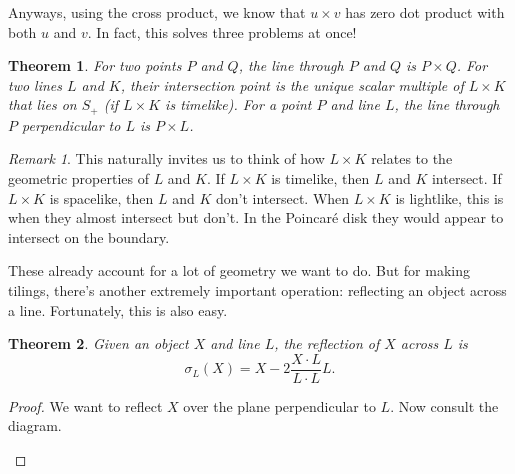 \documentclass{article}
\newtheorem{thm}{Theorem}
\theoremstyle{definition}
\theoremstyle{remark}
\newtheorem*{rmk}{Remark}
\begin{document}
Anyways, using the cross product, we know that $u\times v$ has zero dot product with both $u$ and $v$. In fact, this solves three problems at once!
\begin{thm}
    For two points $P$ and $Q$, the line through $P$ and $Q$ is $P\times Q$. For two lines $L$ and $K$, their intersection point is the unique scalar multiple of $L\times K$ that lies on $S_+$ (if $L\times K$ is timelike). For a point $P$ and line $L$, the line through $P$ perpendicular to $L$ is $P\times L$.
\end{thm}

\begin{rmk}
    This naturally invites us to think of how $L\times K$ relates to the geometric properties of $L$ and $K$. If $L\times K$ is timelike, then $L$ and $K$ intersect. If $L\times K$ is spacelike, then $L$ and $K$ don't intersect. When $L\times K$ is lightlike, this is when they almost intersect but don't. In the Poincar\'e disk they would appear to intersect on the boundary.
\end{rmk}

These already account for a lot of geometry we want to do. But for making tilings, there's another extremely important operation: reflecting an object across a line. Fortunately, this is also easy.
\begin{thm}
Given an object $X$ and line $L$, the reflection of $X$ across $L$ is
\[\sigma_L(X)=X-2\frac{X\cdot L}{L\cdot L}L.\]
\end{thm}
\begin{proof}
    We want to reflect $X$ over the plane perpendicular to $L$. Now consult the diagram.

    \begin{figure}[h]
        \centering
    \end{figure}
\end{proof}
\end{document}
